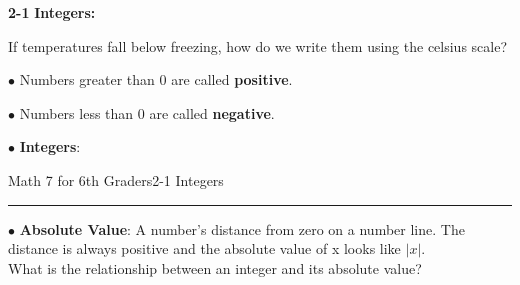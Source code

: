 \begin{enumerate*}
		\item[\Large\textbf{2-1}] \Large\textbf{Integers:}\\
			\begin{enumerate*}
				\item[]If temperatures fall below freezing, how do we write them using the celsius scale?\\
				\item[$\bullet$]Numbers greater than 0 are called \textbf{positive}.\\
				\item[$\bullet$]Numbers less than 0 are called \textbf{negative}.
				\item[$\bullet$]\textbf{Integers}:\\
				\item[]
					
\newpage
\noindent\Large{Math 7 for 6th Graders\hfill 2-1 Integers}
\noindent\hrule
\vspace{5mm}
					
				\item[$\bullet$]\textbf{Absolute Value}: A number's distance from zero on a number line. The distance is always positive and the absolute value of x looks like $|x|$.\\
					What is the relationship between an integer and its absolute value?\\
			\end{enumerate*}
			

\end{enumerate*}
